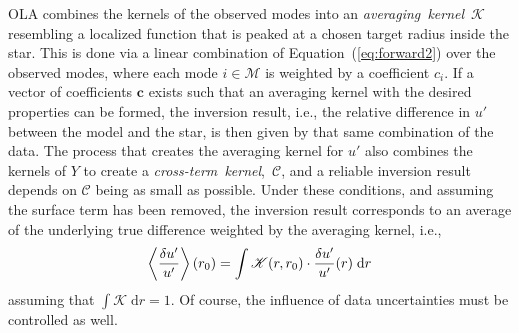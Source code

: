 OLA combines the kernels of the observed modes into an \emph{averaging~kernel}~$\mathscr{K}$ resembling a localized function that is peaked at a chosen target radius inside the star. 
This is done via a linear combination of Equation~(\ref{eq:forward2}) over the observed modes, where each mode ${i \in \mathscr{M}}$ is weighted by a coefficient $c_i$. 
If a vector of coefficients $\mathbf c$ exists such that an averaging kernel with the desired properties can be formed, the inversion result, i.e., the relative difference in $u'$ between the model and the star, is then given by that same combination of the data. 
The process that creates the averaging kernel for $u'$ also combines the kernels of $Y$ to create a \emph{cross-term~kernel},~$\mathscr{C}$, and a reliable inversion result depends on $\mathscr{C}$ being as small as possible. 
Under these conditions, and assuming the surface term has been removed, the inversion result corresponds to an average of the underlying true difference weighted by the averaging kernel, i.e.,
\begin{equation}
    \left\langle\frac{\delta u'}{u'}\right\rangle(r_0)
    =
    \int{\mathscr{K}}(r,r_0)\cdot \frac{\delta u'}{u'}(r) \; \text{d}r
\end{equation}
assuming that ${\int{\mathscr{K}}\;\text{d}r=1}$.
Of course, the influence of data uncertainties must  be controlled as well.


